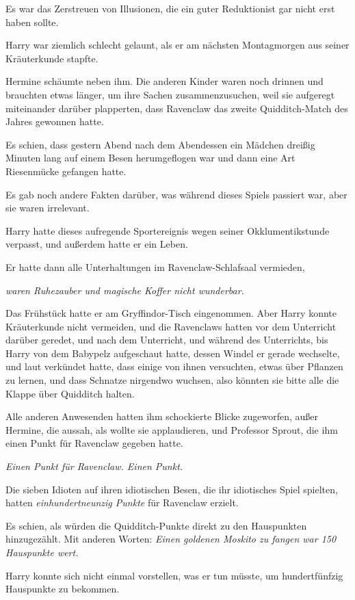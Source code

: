 {Es war das Zerstreuen von Illusionen, die ein guter Reduktionist gar nicht erst haben sollte.

Harry war ziemlich schlecht gelaunt, als er am nächsten Montagmorgen aus seiner Kräuterkunde stapfte.

Hermine schäumte neben ihm. Die anderen Kinder waren noch drinnen und brauchten etwas länger, um ihre Sachen zusammenzusuchen, weil sie aufgeregt miteinander darüber plapperten, dass Ravenclaw das zweite Quidditch-Match des Jahres gewonnen hatte.

Es schien, dass gestern Abend nach dem Abendessen ein Mädchen dreißig Minuten lang auf einem Besen herumgeflogen war und dann eine Art Riesenmücke gefangen hatte.

Es gab noch andere Fakten darüber, was während dieses Spiels passiert war, aber sie waren irrelevant.

Harry hatte dieses aufregende Sportereignis wegen seiner Okklumentikstunde verpasst, und außerdem hatte er ein Leben.

Er hatte dann alle Unterhaltungen im Ravenclaw-Schlafsaal vermieden,

\emph{waren Ruhezauber und magische Koffer nicht wunderbar.}

Das Frühstück hatte er am Gryffindor-Tisch eingenommen. Aber Harry konnte Kräuterkunde nicht vermeiden, und die Ravenclaws hatten vor dem Unterricht darüber geredet, und nach dem Unterricht, und während des Unterrichts, bis Harry von dem Babypelz aufgeschaut hatte, dessen Windel er gerade wechselte, und laut verkündet hatte, dass einige von ihnen versuchten, etwas über Pflanzen zu lernen, und dass Schnatze nirgendwo wuchsen, also könnten sie bitte alle die Klappe über Quidditch halten.

Alle anderen Anwesenden hatten ihm schockierte Blicke zugeworfen, außer Hermine, die aussah, als wollte sie applaudieren, und Professor Sprout, die ihm einen Punkt für Ravenclaw gegeben hatte.

\emph{Einen Punkt für Ravenclaw. Einen Punkt.}

Die sieben Idioten auf ihren idiotischen Besen, die ihr idiotisches Spiel spielten, hatten \emph{einhundertneunzig Punkte} für Ravenclaw erzielt.

Es schien, als würden die Quidditch-Punkte direkt zu den Hauspunkten hinzugezählt. Mit anderen Worten: \emph{Einen goldenen Moskito zu fangen war 150 Hauspunkte wert.}

Harry konnte sich nicht einmal vorstellen, was er tun müsste, um hundertfünfzig Hauspunkte zu bekommen.

}
